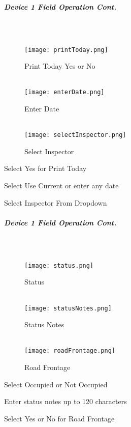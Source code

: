\documentclass[class=article , crop=false, titlepage, twoside, multi={itemize, figure, verbatim}, float=false]{standalone}
\begin{document}
\clearpage
\subparagraph*{Device 1 Field Operation Cont.}
\subparagraph*{\\}
\begin{wrapfigure}{r}{0.5\textwidth}
\centering
\texttt{[image: printToday.png]}
\caption {Print Today Yes or No}
\vspace{.2in}
\HRule \\[.4cm] %
\vspace{.2in}
\texttt{[image: enterDate.png]}
\caption{Enter Date}
\vspace{.2in}
\HRule \\[.4cm] %
\vspace{.2in}
\texttt{[image: selectInspector.png]}
\caption{Select Inspector}
\end{wrapfigure}
Select Yes for Print Today\\
\vspace{2.5in}

\noindent Select Use Current or enter any date\\
\vspace{2in}

\noindent Select Inspector From Dropdown\\

\clearpage
\subparagraph*{Device 1 Field Operation Cont.}
\subparagraph*{\\}
\begin{wrapfigure}{r}{0.5\textwidth}
\centering
\texttt{[image: status.png]}
\caption {Status}
\vspace{.2in}
\HRule \\[.4cm] %
\vspace{.2in}
\texttt{[image: statusNotes.png]}
\caption{Status Notes}
\vspace{.2in}
\HRule \\[.4cm] %
\vspace{.2in}
\texttt{[image: roadFrontage.png]}
\caption{Road Frontage}
\end{wrapfigure}
Select Occupied or Not Occupied\\
\vspace{2in}

\noindent Enter status notes up to 120 characters\\
\vspace{2in}

\noindent Select Yes or No for Road Frontage\\
\end{document}
